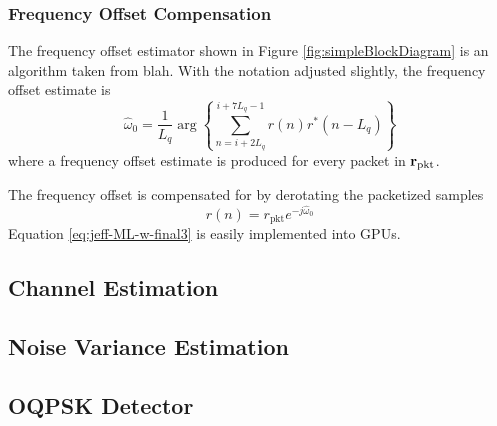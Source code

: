 
\subsubsection{Frequency Offset Compensation}
\label{sec:jeffs_frequencyoffsetestimator}
The frequency offset estimator shown in Figure \ref{fig:simpleBlockDiagram} is an algorithm taken from blah.
With the notation adjusted slightly, the frequency offset estimate is
\begin{equation}
	\hat{\omega}_0 = \frac{1}{L_q} \arg\left\{ \sum_{n=i+2L_q}^{i+7L_q-1} r(n)r^\ast(n-L_q)\right\}
	\label{eq:jeff-ML-w-final3}
\end{equation}
where a frequency offset estimate is produced for every packet in $\mathbf{r}_\text{pkt}$.

The frequency offset is compensated for by derotating the packetized samples
\begin{equation}
	r(n) = r_\text{pkt} e^{-j\hat{\omega}_0}
	\label{eq:frequency_compensation}
\end{equation}
Equation \eqref{eq:jeff-ML-w-final3} is easily implemented into GPUs. 

\subsection{Channel Estimation}
\label{sec:channel_estimation}

\subsection{Noise Variance Estimation}
\label{sec:noise_variance_estimation}

\subsection{OQPSK Detector}
\label{sec:oqpsk_detector}

